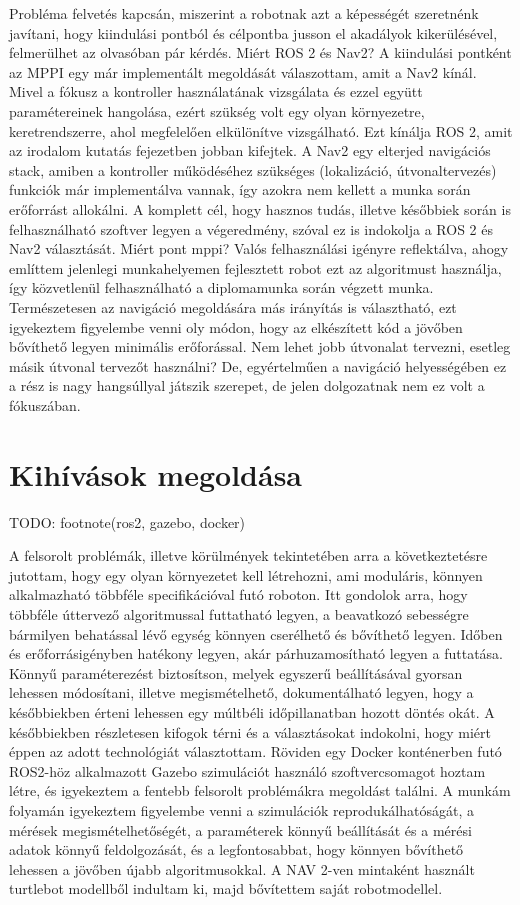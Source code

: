 Probléma felvetés  kapcsán, miszerint a robotnak azt a képességét szeretnénk javítani, hogy kiindulási pontból és célpontba jusson el akadályok kikerülésével, felmerülhet az olvasóban pár kérdés. Miért ROS 2 és Nav2? A kiindulási pontként az MPPI egy már implementált megoldását válaszottam, amit a Nav2 kínál. Mivel a fókusz a kontroller használatának vizsgálata és ezzel együtt paramétereinek hangolása, ezért szükség volt egy olyan környezetre, keretrendszerre, ahol megfelelően elkülönítve vizsgálható. Ezt kínálja  ROS 2, amit az irodalom kutatás fejezetben jobban kifejtek. A Nav2 egy elterjed navigációs stack, amiben a kontroller működéséhez szükséges (lokalizáció, útvonaltervezés) funkciók már implementálva vannak, így azokra nem kellett a munka során erőforrást allokálni. A komplett cél, hogy hasznos tudás, illetve későbbiek során is felhasználható szoftver legyen a végeredmény, szóval ez is indokolja a ROS 2 és Nav2 választását.
Miért pont mppi? Valós felhasználási igényre reflektálva, ahogy említtem jelenlegi munkahelyemen fejlesztett robot ezt az algoritmust használja, így közvetlenül felhasználható a diplomamunka során végzett munka. Természetesen az navigáció megoldására más irányítás is választható, ezt igyekeztem figyelembe venni oly módon, hogy az elkészített kód a jövőben bővíthető legyen minimális erőforással. Nem lehet jobb útvonalat tervezni, esetleg másik útvonal tervezőt használni? De, egyértelműen a navigáció helyességében ez a rész is nagy hangsúllyal játszik szerepet, de jelen dolgozatnak nem ez volt a fókuszában.

\section{Kihívások megoldása}
TODO: footnote(ros2, gazebo, docker)

A felsorolt problémák, illetve körülmények tekintetében arra a következtetésre jutottam, hogy egy olyan környezetet kell létrehozni, ami moduláris, könnyen alkalmazható többféle specifikációval futó roboton. Itt gondolok arra, hogy többféle úttervező algoritmussal futtatható legyen, a beavatkozó sebességre bármilyen behatással lévő egység könnyen cserélhető és bővíthető legyen. Időben és erőforrásigényben hatékony legyen, akár párhuzamosítható legyen a futtatása. Könnyű paraméterezést biztosítson, melyek egyszerű beállításával gyorsan lehessen módosítani, illetve megismételhető, dokumentálható legyen, hogy a későbbiekben érteni lehessen egy múltbéli időpillanatban hozott döntés okát. A későbbiekben részletesen kifogok térni és a választásokat indokolni, hogy miért éppen az adott technológiát választottam. Röviden egy Docker konténerben futó ROS2-höz alkalmazott Gazebo szimulációt használó szoftvercsomagot hoztam létre, és igyekeztem a fentebb felsorolt problémákra megoldást találni. A munkám folyamán igyekeztem figyelembe venni a szimulációk reprodukálhatóságát, a mérések megismételhetőségét, a paraméterek könnyű beállítását és a mérési adatok könnyű feldolgozását, és a legfontosabbat, hogy könnyen bővíthető lehessen a jövőben újabb algoritmusokkal. A NAV 2-ven mintaként használt turtlebot modellből indultam ki, majd bővítettem saját robotmodellel.

